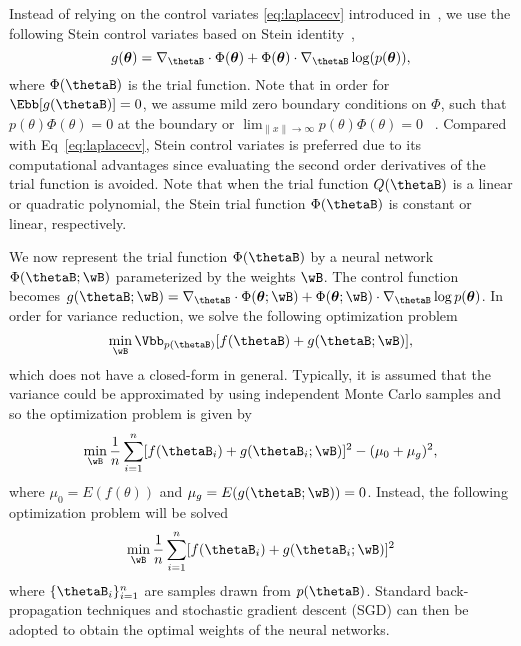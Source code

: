 \documentclass[runningheads]{llncs}
\begin{document}
Instead of relying on the control variates \eqref{eq:laplacecv} introduced in~\cite{mira2013zero}, we use the following Stein control variates based on Stein identity~\cite{stein1972bound,oates2017control}, 
\begin{equation}\label{eq:steincv}
g(\bm{\theta}) = \nabla_{\thetaB} \cdot \Phi(\bm{\theta}) + \Phi(\bm{\theta}) \cdot \nabla_{\thetaB} \log (p(\bm{\theta})),
\end{equation}
where $\Phi(\thetaB)$ is the trial function. Note that in order for $\Ebb[g(\thetaB)] =0$, we assume mild zero boundary conditions on $\Phi$, such that $p(\theta)\Phi(\theta)=0$ at the boundary or $\lim_{\|x\|\rightarrow\infty}p(\theta)\Phi(\theta)=0$ ~\cite{mira2013zero,liu2016stein01,oates2017control}. Compared with Eq~\eqref{eq:laplacecv}, Stein control variates is preferred due to its computational advantages since evaluating the second order derivatives of the trial function is avoided.  Note that when the trial function $Q(\thetaB)$ is a linear or quadratic polynomial, the Stein trial function $\Phi(\thetaB)$ is constant or linear, respectively.  

We now represent the trial function $\Phi(\thetaB)$ by a neural network $\Phi(\thetaB; \wB)$ parameterized by the weights $\wB$. The control function becomes $g(\thetaB; \wB) = \nabla_{\thetaB} \cdot \Phi(\bm{\theta}; \wB) + \Phi(\bm{\theta}; \wB) \cdot \nabla_{\thetaB} \log p(\bm{\theta})$. In order for variance reduction, we solve the following optimization problem 
\begin{equation}
\min_{\wB} \Vbb_{p(\thetaB)} [f(\thetaB) + g(\thetaB; \wB)],
\label{eq:oraclevar}
\end{equation}
which does not have a closed-form in general. Typically, it is assumed that the variance could be approximated by using independent Monte Carlo samples and so the optimization problem is given by
\begin{align}
\label{eq:var}
\min_{\wB} \frac{1}{n}\sum_{i=1}^n [f(\thetaB_i) + g(\thetaB_i; \wB)]^2  -  (\mu_0+\mu_{g})^2,
\end{align} 
where $\mu_0=E(f(\theta))$ and $\mu_g=E(g(\thetaB; \wB))=0$.
Instead, the following optimization problem will be solved 
\begin{align}
\label{eq:empvar}
\min_{\wB} \frac{1}{n}\sum_{i=1}^n [f(\thetaB_i) + g(\thetaB_i; \wB)]^2  
\end{align}
where $\{ \thetaB_i \}_{i=1}^n$ are samples drawn from $p(\thetaB)$.
Standard back-propagation techniques and stochastic gradient descent (SGD) can then be adopted to obtain the optimal weights of the neural networks. 
\end{document}
